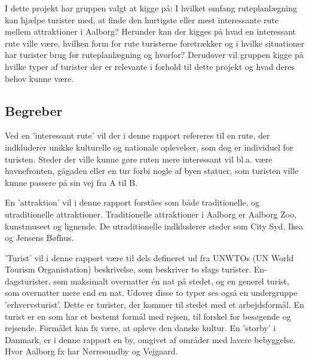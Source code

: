 I dette projekt har gruppen valgt at kigge på: I hvilket omfang ruteplanlægning kan hjælpe turister med, at finde den hurtigste eller mest interessante rute mellem attraktioner i Aalborg? Herunder kan der kigges på hvad en interessant rute ville være, hvilken form for rute turisterne foretrækker og i hvilke situationer har turister brug for ruteplanlægning og hvorfor? Derudover vil gruppen kigge på hvilke typer af turister der er relevante i forhold til dette projekt og hvad deres behov kunne være. \newline \newpage

\subsection{Begreber}
Ved en ’interessant rute’ vil der i denne rapport refereres til en rute, der indkluderer unikke kulturelle og nationale oplevelser, som dog er individuel for turisten. Steder der ville kunne gøre ruten mere interessant vil bl.a. være havnefronten, gågaden eller en tur forbi nogle af byen statuer, som turisten ville kunne passere på sin vej fra A til B.\newline

En ’attraktion’ vil i denne rapport forståes som både traditionelle, og utraditionelle attraktioner. Traditionelle attraktioner i Aalborg er Aalborg Zoo, kunstmuseet og lignende. De utraditionelle indkluderer steder som City Syd, Ikea og Jensens Bøfhus.\newline

’Turist’ vil i denne rapport være til dels defineret ud fra UNWTOs (UN World Tourism Organistation) beskrivelse, som beskriver to slags turister. En-dagsturister, som maksimalt overnatter én nat på stedet, og en generel turist, som overnatter mere end en nat\citep{Turismen}. Udover disse to typer ses også en undergruppe ’erhvervsturist’. Dette er turister, der kommer til stedet med et arbejdsformål. \newline
En turist er en som har et bestemt formål med rejsen, til forskel for besøgende og rejsende. Formålet kan fx være, at opleve den danske kultur. \newline
En ’storby’ i Danmark, er i denne rapport en by, omgivet af områder med lavere bebyggelse. Hvor Aalborg fx har Nørresundby og Vejgaard.


